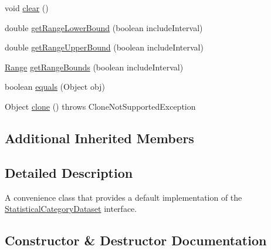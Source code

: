 \begin{DoxyCompactItemize}
\item 
void \mbox{\hyperlink{classorg_1_1jfree_1_1data_1_1statistics_1_1_default_statistical_category_dataset_a7cc0c6896682dcab3972a9a3c4dcb80f}{clear}} ()
\item 
double \mbox{\hyperlink{classorg_1_1jfree_1_1data_1_1statistics_1_1_default_statistical_category_dataset_ae20e8ce5b0dfff4b36629d20584e0f20}{get\+Range\+Lower\+Bound}} (boolean include\+Interval)
\item 
double \mbox{\hyperlink{classorg_1_1jfree_1_1data_1_1statistics_1_1_default_statistical_category_dataset_a11d0eee861d88a758d3a400d428aebc8}{get\+Range\+Upper\+Bound}} (boolean include\+Interval)
\item 
\mbox{\hyperlink{classorg_1_1jfree_1_1data_1_1_range}{Range}} \mbox{\hyperlink{classorg_1_1jfree_1_1data_1_1statistics_1_1_default_statistical_category_dataset_ac3440b80805636d47b07b69ee1407b35}{get\+Range\+Bounds}} (boolean include\+Interval)
\item 
boolean \mbox{\hyperlink{classorg_1_1jfree_1_1data_1_1statistics_1_1_default_statistical_category_dataset_a6aec278dd7ade2ee859efc7b3e70ffa1}{equals}} (Object obj)
\item 
Object \mbox{\hyperlink{classorg_1_1jfree_1_1data_1_1statistics_1_1_default_statistical_category_dataset_aabdac5bad125320f7051cf58a3b14ec9}{clone}} ()  throws Clone\+Not\+Supported\+Exception 
\end{DoxyCompactItemize}
\subsection*{Additional Inherited Members}


\subsection{Detailed Description}
A convenience class that provides a default implementation of the \mbox{\hyperlink{interfaceorg_1_1jfree_1_1data_1_1statistics_1_1_statistical_category_dataset}{Statistical\+Category\+Dataset}} interface. 

\subsection{Constructor \& Destructor Documentation}
\mbox{\label{classorg_1_1jfree_1_1data_1_1statistics_1_1_default_statistical_category_dataset_a1c770d48ebf09d81d8df634eb53d94da}} 
